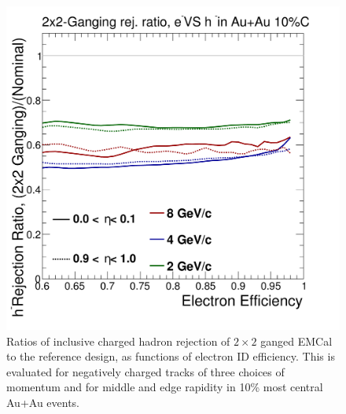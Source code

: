 \begin{figure}[hbt]
  \centering
  \includegraphics[width=0.5\linewidth]{figs/DrawEcal_Likelihood_Sum_RejectionCurve_AuAuSummary_Compare}
  \caption{ Ratios of inclusive charged hadron rejection of $2\times2$
    ganged EMCal to the reference design, as functions of electron ID
    efficiency. This is evaluated for negatively charged tracks of
    three choices of momentum and for middle and edge rapidity in 10\%
    most central Au+Au events.}
\label{fig:eid_ratios_auau}
\end{figure}


